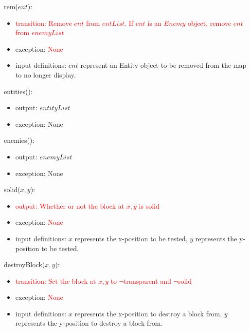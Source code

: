 \documentclass[12pt]{article}
\newcommand{\Implies}{\Rightarrow}
\begin{document}
\noindent rem($ent$):
\begin{itemize}
    \item \textcolor{red}{transition: Remove $ent$ from $entList$. If $ent$ is an $Enemy$ object, remove $ent$ from $enemyList$}
    \item exception: \textcolor{red}{None}
    \item input definitions: $ent$ represent an Entity object to be removed from the map to no longer display.
\end{itemize}

\noindent entities():
\begin{itemize}
    \item output: $entityList$ 
    \item exception: None
\end{itemize}

\noindent enemies():
\begin{itemize}
    \item output: $enemyList$ 
    \item exception: None
\end{itemize}

\noindent solid($x, y$):
\begin{itemize}
    \item \textcolor{red}{output: Whether or not the block at $x, y$ is solid}
    \item exception: \textcolor{red}{None}
    \item input definitions: $x$ represents the x-position to be tested, $y$ represents the y-position to be tested. 
\end{itemize}

\noindent destroyBlock($x, y$):
\begin{itemize}
    \item \textcolor{red}{transition: Set the block at $x, y$ to $\lnot$transparent and $\lnot$solid}
    \item exception: \textcolor{red}{None}
    \item input definitions: $x$ represents the x-position to destroy a block from, $y$ represents the y-position to destroy a block from.
\end{itemize}
\end{document}
